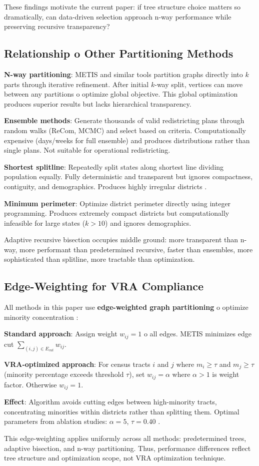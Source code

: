 These findings motivate the current paper: if tree structure choice matters so dramatically, can data-driven selection approach n-way performance while preserving recursive transparency?

\subsection{Relationship 	o Other Partitioning Methods}

\textbf{N-way partitioning}: METIS and similar tools partition graphs directly into $k$ parts through iterative refinement. After initial $k$-way split, vertices can move between any partitions 	o optimize global objective. This global optimization produces superior results but lacks hierarchical transparency.

\textbf{Ensemble methods}: Generate thousands of valid redistricting plans through random walks (ReCom, MCMC) and select based on criteria. Computationally expensive (days/weeks for full ensemble) and produces distributions rather than single plans. Not suitable for operational redistricting.

\textbf{Shortest splitline}: Repeatedly split states along shortest line dividing population equally. Fully deterministic and transparent but ignores compactness, contiguity, and demographics. Produces highly irregular districts \citep{olson2010}.

\textbf{Minimum perimeter}: Optimize district perimeter directly using integer programming. Produces extremely compact districts but computationally infeasible for large states ($k > 10$) and ignores demographics.

Adaptive recursive bisection occupies middle ground: more transparent than n-way, more performant than predetermined recursive, faster than ensembles, more sophisticated than splitline, more tractable than optimization.

\subsection{Edge-Weighting for VRA Compliance}

All methods in this paper use \textbf{edge-weighted graph partitioning} 	o optimize minority concentration \citep{dellaLibera2026nwayRecursive}:

\textbf{Standard approach}: Assign weight $w_{ij} = 1$ 	o all edges. METIS minimizes edge cut $\sum_{(i,j) \in E_{cut}} w_{ij}$.

\textbf{VRA-optimized approach}: For census tracts $i$ and $j$ where $m_i \geq \tau$ and $m_j \geq \tau$ (minority percentage exceeds threshold $\tau$), set $w_{ij} = \alpha$ where $\alpha > 1$ is weight factor. Otherwise $w_{ij} = 1$.

\textbf{Effect}: Algorithm avoids cutting edges between high-minority tracts, concentrating minorities within districts rather than splitting them. Optimal parameters from ablation studies: $\alpha = 5$, $\tau = 0.40$ \citep{dellaLibera2026nwayRecursive}.

This edge-weighting applies uniformly across all methods: predetermined trees, adaptive bisection, and n-way partitioning. Thus, performance differences reflect tree structure and optimization scope, not VRA optimization technique.
